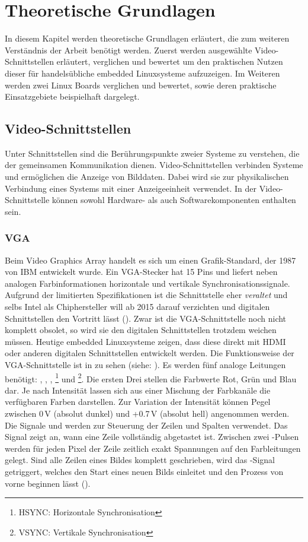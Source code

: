\chapter{Theoretische Grundlagen}
\label{cha:Grundlagen}
In diesem Kapitel werden theoretische Grundlagen erläutert, die zum weiteren Verständnis der Arbeit benötigt werden. Zuerst werden ausgewählte Video-Schnittstellen erläutert, verglichen und bewertet um den praktischen Nutzen dieser für handelsübliche embedded Linuxsysteme aufzuzeigen. Im Weiteren werden zwei Linux Boards verglichen und bewertet, sowie deren praktische Einsatzgebiete beispielhaft dargelegt.

\section{Video-Schnittstellen}
Unter Schnittstellen sind die Berührungspunkte zweier Systeme zu verstehen, die der gemeinsamen Kommunikation dienen. Video-Schnittstellen verbinden Systeme und ermöglichen die Anzeige von Bilddaten. Dabei wird sie zur physikalischen Verbindung eines Systems mit einer Anzeigeeinheit verwendet. In der Video-Schnittstelle können sowohl Hardware- als auch Softwarekomponenten enthalten sein.
\subsection{VGA}
Beim Video Graphics Array handelt es sich um einen Grafik-Standard, der 1987 von IBM entwickelt wurde. Ein VGA-Stecker hat 15 Pins und liefert neben analogen Farbinformationen horizontale und vertikale Synchronisationssignale. Aufgrund der limitierten Spezifikationen ist die Schnittstelle eher \textit{veraltet} und selbs Intel als Chiphersteller will ab 2015 darauf verzichten und digitalen Schnittstellen den Vortritt lässt (\cite{Intel2010}). Zwar ist die VGA-Schnittstelle noch nicht komplett obsolet, so wird sie den digitalen Schnittstellen trotzdem weichen müssen. Heutige embedded Linuxsysteme zeigen, dass diese direkt mit HDMI oder anderen digitalen Schnittstellen entwickelt werden.
Die Funktionsweise der VGA-Schnittstelle ist in  zu sehen (siehe: \cite{Valcarce2011}). Es werden fünf analoge Leitungen benötigt: , , , \footnote{HSYNC: Horizontale Synchronisation} und \footnote{VSYNC: Vertikale Synchronisation}. Die ersten Drei stellen die Farbwerte Rot, Grün und Blau dar. Je nach Intensität lassen sich aus einer Mischung der Farbkanäle die verfügbaren Farben darstellen. Zur Variation der Intensität können Pegel zwischen 0\,V (absolut dunkel) und +0.7\,V (absolut hell) angenommen werden. Die Signale  und  werden zur Steuerung der Zeilen und Spalten verwendet. Das Signal  zeigt an, wann eine Zeile vollständig abgetastet ist. Zwischen zwei -Pulsen werden für jeden Pixel der Zeile zeitlich exakt Spannungen auf den Farbleitungen gelegt. Sind alle Zeilen eines Bildes komplett geschrieben, wird das -Signal getriggert, welches den Start eines neuen Bilds einleitet und den Prozess von vorne beginnen lässt (\cite{Valcarce2011}).

